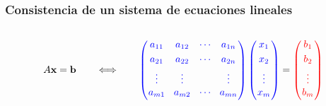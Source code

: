 {\nologo
\begin{frame}\frametitle{Consistencia de un sistema de ecuaciones lineales}

\vspace{-3mm}

\begin{columns}[c]
	\begin{column}{1.15\textwidth}

\[
	A\mathbf{x} = \mathbf{b} 
	\qquad \Longleftrightarrow \qquad 
	{\color{blue} 
	\left(
	\begin{array}{@{\hspace{0.1\tabcolsep}}c@{\hspace{1.5\tabcolsep}}c@{\hspace{1.5\tabcolsep}}c@{\hspace{1.5\tabcolsep}}c@{\hspace{0.1\tabcolsep}}}
	a_{11} & a_{12} & \cdots & a_{1n} \\[1mm]
	a_{21} & a_{22} & \cdots & a_{2n} \\[1mm]
	\vdots & \vdots &        & \vdots \\[0mm]
	a_{m1} & a_{m2} & \cdots & a_{mn} \\[1mm]
	\end{array}
	\right)
	\left(
	\begin{array}{@{\hspace{0.1\tabcolsep}}c@{\hspace{0.1\tabcolsep}}}
	x_{1} \\[1mm]
	x_{2} \\[1mm]
	\vdots \\[0mm]
	x_{m} \\[1mm]
	\end{array}
	\right)
	}
	=
	{\color{red}
	\left(
	\begin{array}{@{\hspace{0.1\tabcolsep}}c@{\hspace{0.1\tabcolsep}}}
	b_{1} \\[1mm]
	b_{2} \\[1mm]
	\vdots \\[0mm]
	b_{m} \\[1mm]
	\end{array}
	\right)
}
\]

\vspace{1mm}


\end{column}
\end{columns}
\end{frame}}

